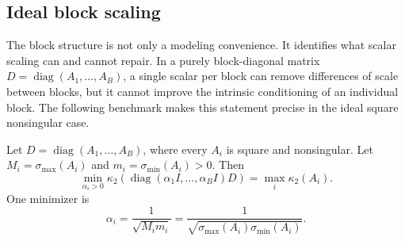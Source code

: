 \documentclass[AMA,Times1COL]{WileyNJDv5} %
\newcommand{\diag}{\operatorname{diag}}
\begin{document}
\subsection{Ideal block scaling}
\label{subsec:ideal-block-scaling}

The block structure is not only a modeling convenience. It identifies what scalar scaling
can and cannot repair. In a purely block-diagonal matrix $D=\diag(A_1,\ldots,A_B)$, a
single scalar per block can remove differences of scale between blocks, but it cannot
improve the intrinsic conditioning of an individual block. The following benchmark makes
this statement precise in the ideal square nonsingular case.

\begin{proposition}
\label{prop:ideal-block-scaling}
Let $D=\diag(A_1,\ldots,A_B)$, where every $A_i$ is square and nonsingular. Let
$M_i=\sigma_{\max}(A_i)$ and $m_i=\sigma_{\min}(A_i)>0$. Then
\begin{equation}
\min_{\alpha_i>0}
\kappa_2\!\left(\diag(\alpha_1 I,\ldots,\alpha_B I)D\right)
=
\max_i \kappa_2(A_i).
\label{eq:ideal-block-minimax}
\end{equation}
One minimizer is
\begin{equation}
\alpha_i=\frac{1}{\sqrt{M_i m_i}}
=
\frac{1}{\sqrt{\sigma_{\max}(A_i)\sigma_{\min}(A_i)}} .
\label{eq:ideal-block-factor}
\end{equation}
\end{proposition}
\end{document}
